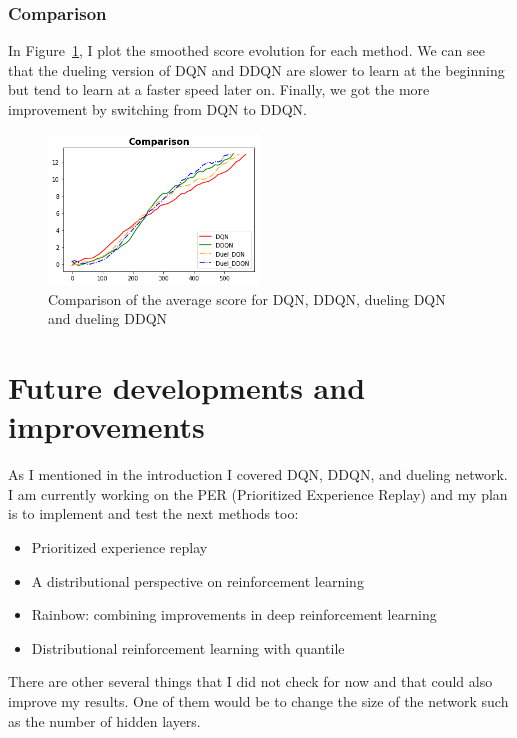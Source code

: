 \documentclass[12pt]{article}
\begin{document}
\subsubsection{Comparison}
In Figure~\ref{fig:comparison}, I plot the smoothed score evolution for each method. 
We can see that the dueling version of DQN and DDQN are slower to learn at the beginning but tend to learn at a faster speed later on. 
Finally, we got the more improvement by switching from DQN to DDQN.

\begin{figure}[H]
 \centering
  \includegraphics[width=0.5\textwidth]{../PNG/Comparison.png}
  \caption{Comparison of the average score for DQN, DDQN, dueling DQN and dueling DDQN}
  \label{fig:comparison}
\end{figure}

\section{Future developments and improvements}
As I mentioned in the introduction I covered DQN, DDQN, and dueling network. I am currently working on the PER (Prioritized Experience Replay) and my plan is to implement and test the next methods too:

\begin{itemize}
\item Prioritized experience replay
\item A distributional perspective on reinforcement learning
\item Rainbow: combining improvements in deep reinforcement learning 
\item Distributional reinforcement learning with quantile 
\end{itemize}

There are other several things that I did not check for now and that could also improve my results. One of them would be to change the size of the network such as the number of hidden layers.

{}

\end{document}
